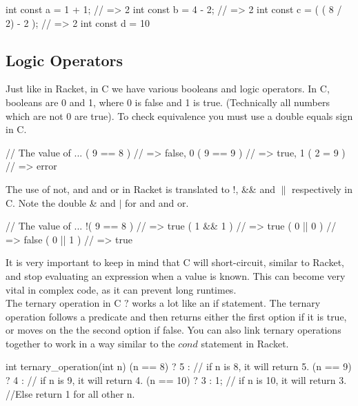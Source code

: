 \begin{code}[C]
int const a = 1 + 1; // => 2
int const b = 4 - 2; // => 2
int const c = ( ( 8 / 2) - 2 ); // => 2
int const d = 10 %
\end{code}


\subsection*{Logic Operators}

Just like in Racket, in C we have various booleans and logic operators.  In C, booleans are 0 and 1, where 0 is false and 1 is true.  (Technically all numbers which are not 0 are true).  To check equivalence you must use a double equals sign in C.

\begin{code}[C]
// The value of ...
( 9 == 8 ) // => false, 0
( 9 == 9 ) // => true, 1
( 2 = 9 ) // => error
\end{code}

The use of not, and and or in Racket is translated to !, \&\& and $\parallel$ respectively in C. Note the double \& and $\mid$ for and and or.\\

\begin{code}[C]
// The value of ...
!( 9 == 8 ) // => true
( 1 && 1 ) // => true
( 0 || 0 ) // => false
( 0 || 1 ) // => true
\end{code}

It is very important to keep in mind that C will short-circuit, similar to Racket, and stop evaluating an expression when a value is known. This can become very vital in complex code, as it can prevent long runtimes.\\

The ternary operation in C $?$ works a lot like an if statement.  The ternary operation follows a predicate and then returns either the first option if it is true, or moves on the the second option if false.  You can also link ternary operations together to work in a way similar to the $cond$ statement in Racket.\\

\begin{code}[C]
int ternary_operation(int n)
{
	(n == 8) ? 5 : // if n is 8, it will return 5.
	(n == 9) ? 4 : // if n is 9, it will return 4.
	(n == 10) ? 3 : 1; // if n is 10, it will return 3. 
	//Else return 1 for all other n.
}
\end{code}

